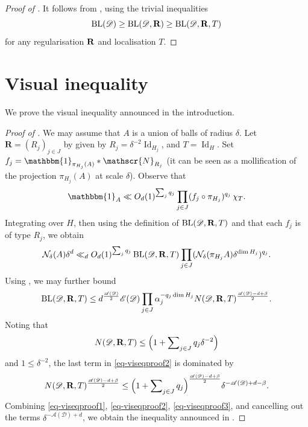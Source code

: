\documentclass[a4paper,english]{amsart}
\theoremstyle{definition}
\newcommand{\sN}{\mathscr{N}}
\newcommand{\1}{\mathbbm{1}}
\newcommand{\bbR}{{\bf{R}}}
\newcommand{\cN} {{\mathcal N}}
\newcommand{\sD} {{\mathscr D}}
\newcommand{\sE}{\mathscr{E}}
\newcommand{\sA}{\mathscr{A}}
\newcommand{\bR}{\mathbf{R}}
\DeclareMathOperator{\Id}{Id}
\DeclareMathOperator{\BL}{BL}
\begin{document}
\begin{proof}[Proof of ]
It follows from ,
using the trivial inequalities
\[
\BL(\sD) \geq \BL(\sD, \bbR) \geq \BL(\sD, \bbR, T)
\]
for any regularisation $\bbR$ and localisation $T$.
\end{proof}






\section{Visual inequality} \label{Sec-visual-inequality}

We prove the visual inequality announced in the introduction.


\begin{proof}[Proof of ]
We may assume that $A$ is a union of balls of radius $\delta$.
Let $\bR=(R_j)_{j \in J}$ by given by $R_j = \delta^{-2} \Id_{H_j}$, and $T=\Id_{H}$. Set  $f_{j}=\1_{\pi_{H_{j}}(A)} * \sN_{R_{j}}$ (it can be seen as a mollification of the projection $\pi_{H_j}(A)$ at scale $\delta$).
Observe that
$$\1_{A} \ll O_{d}(1)^{\sum_{j}q_{j}} \prod_{j \in J} (f_{j}\circ \pi_{H_j})^{q_{j}} \,\chi_{T}.$$
Integrating over $H$, then using the definition of $\BL(\sD, \bbR, T)$ and  that each $f_{j}$ is of  type $R_{j}$,  we obtain
\begin{equation}\label{eq-viseqproof1}
\cN_{\delta}(A)\delta^d \ll_{d} O_{d}(1)^{\sum_{j}q_{j}}\BL(\sD, \bbR, T) \prod_{j \in J}(\cN_{\delta}(\pi_{H_j}A) \delta^{\dim H_j})^{q_{j}}.
 \end{equation}
 Using , we may further  bound
\begin{equation}\label{eq-viseqproof2}
\BL(\sD, \bbR, T) \leq d^{\frac{\sA(\sD)}{2}} \sE(\sD) \prod_{j \in J} \alpha_j^{- q_j \dim H_j} N(\sD, \bbR, T)^{\frac{\sA(\sD)-d+\beta}{2}}.
\end{equation}
Noting that
\[
N(\sD, \bbR, T) \leq
\Bigl(1+\sum\nolimits_{j \in J}q_{j} \delta^{-2}\Bigr)
\]
and $1 \leq \delta^{-2}$, the  last term in \eqref{eq-viseqproof2} is dominated by
\begin{equation}\label{eq-viseqproof3}
N(\sD, \bbR, T)^{\frac{\sA(\sD)-d+\beta}{2}} \leq
\Bigl(1+\sum\nolimits_{j \in J}q_{j}\Bigr)^{\frac{\sA(\sD)-d+\beta}{2}} \delta^{-\sA(\sD)+d-\beta}.
\end{equation}
Combining \eqref{eq-viseqproof1}, \eqref{eq-viseqproof2}, \eqref{eq-viseqproof3}, and cancelling out the terms $\delta^{-\sA(\sD)+d}$, we obtain the inequality announced in .
\end{proof}
\end{document}
